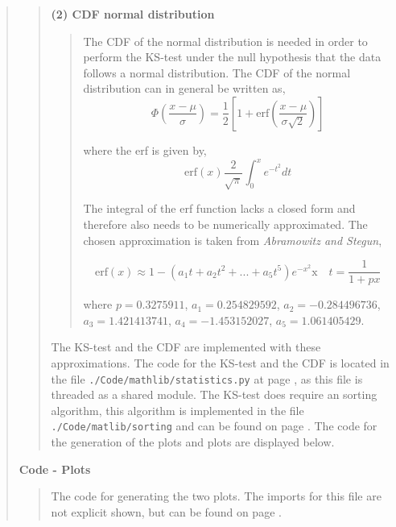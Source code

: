\begin{quote}
\begin{quote}
\textbf{(2) CDF normal distribution}
\begin{quote}
The CDF of the normal distribution is needed in order to perform the KS-test under the null hypothesis that the data follows a normal distribution. The CDF of the normal distribution can in general be written as,
\begin{equation}
\Phi\left( \frac{x- \mu}{\sigma}\right) = \frac{1}{2} \left[ 1 + \text{erf} \left( \frac{x - \mu}{\sigma\sqrt{2}} \right) \right]
\end{equation}

where the erf is given by,
\begin{equation}
\text{erf}(x)  \frac{2}{\sqrt{\pi}} \int_0^{x} e^{-t^2} dt
\end{equation}

The integral of the erf function lacks a closed form and therefore also needs to be numerically approximated. The chosen approximation is taken from \textit{Abramowitz and Stegun},

\begin{equation}
\text{erf}(x) \approx 1- (a_1t+a_2t^2 + ... + a_5t^5)e^{-x^2} \text{x} \quad t = \frac{1}{1+px}
\end{equation}

where $p  =0.3275911$, $a_1 =  0.254829592$, $a_2 = -0.284496736$, $a_3 = 1.421413741$, $a_4 =  -1.453152027$, $a_5 = 1.061405429$.
\end{quote}

The KS-test and the CDF are implemented with these approximations. The code for the KS-test and the CDF  is located in the file \texttt{./Code/mathlib/statistics.py} at page \pageref{CODE:Statistics}, as this file is threaded as a shared module. The KS-test does require an sorting algorithm, this algorithm is implemented in the file \texttt{./Code/matlib/sorting} and can be found on page \pageref{CODE:sorting}. 
 The code for the generation of the plots and plots are displayed below.  
\end{quote}

\newpage
\textbf{Code - Plots}

\begin{quote}
The code for generating the two plots. The imports for this file are not explicit shown, but can be found on page \pageref{CODE:MAIN1}.

\end{quote}
\newpage


\end{quote}
